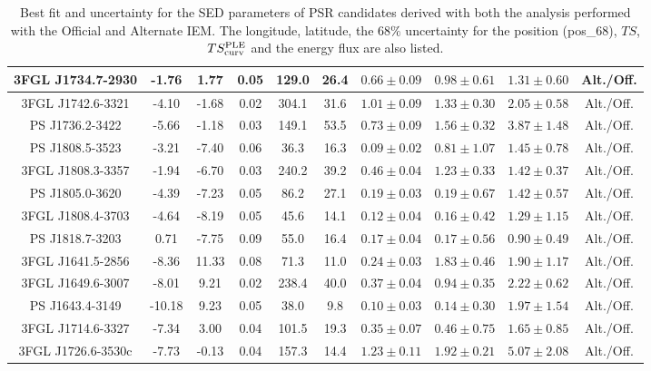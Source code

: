 \begin{table*}
\begin{tabular}{|c|c|c|c|c|c|c|c|c|c|}
\hline 
 3FGL J1734.7-2930 & -1.76 & 1.77 & 0.05 & 129.0 & 26.4 & $0.66\pm0.09$ & $0.98\pm0.61$ & $1.31\pm0.60$ & Alt./Off.\\
\hline 
 3FGL J1742.6-3321 & -4.10 & -1.68 & 0.02 & 304.1 & 31.6 & $1.01\pm0.09$ & $1.33\pm0.30$ & $2.05\pm0.58$ & Alt./Off.\\
\hline 
 PS J1736.2-3422 & -5.66 & -1.18 & 0.03 & 149.1 & 53.5 & $0.73\pm0.09$ & $1.56\pm0.32$ & $3.87\pm1.48$ & Alt./Off.\\
\hline 
 PS J1808.5-3523 & -3.21 & -7.40 & 0.06 & 36.3 & 16.3 & $0.09\pm0.02$ & $0.81\pm1.07$ & $1.45\pm0.78$ & Alt./Off.\\
\hline 
 3FGL J1808.3-3357 & -1.94 & -6.70 & 0.03 & 240.2 & 39.2 & $0.46\pm0.04$ & $1.23\pm0.33$ & $1.42\pm0.37$ & Alt./Off.\\
\hline 
 PS J1805.0-3620 & -4.39 & -7.23 & 0.05 & 86.2 & 27.1 & $0.19\pm0.03$ & $0.19\pm0.67$ & $1.42\pm0.57$ & Alt./Off.\\
\hline 
 3FGL J1808.4-3703 & -4.64 & -8.19 & 0.05 & 45.6 & 14.1 & $0.12\pm0.04$ & $0.16\pm0.42$ & $1.29\pm1.15$ & Alt./Off.\\
\hline 
 PS J1818.7-3203 & 0.71 & -7.75 & 0.09 & 55.0 & 16.4 & $0.17\pm0.04$ & $0.17\pm0.56$ & $0.90\pm0.49$ & Alt./Off.\\
\hline 
 3FGL J1641.5-2856 & -8.36 & 11.33 & 0.08 & 71.3 & 11.0 & $0.24\pm0.03$ & $1.83\pm0.46$ & $1.90\pm1.17$ & Alt./Off.\\
\hline 
 3FGL J1649.6-3007 & -8.01 & 9.21 & 0.02 & 238.4 & 40.0 & $0.37\pm0.04$ & $0.94\pm0.35$ & $2.22\pm0.62$ & Alt./Off.\\
\hline 
 PS J1643.4-3149 & -10.18 & 9.23 & 0.05 & 38.0 & 9.8 & $0.10\pm0.03$ & $0.14\pm0.30$ & $1.97\pm1.54$ & Alt./Off.\\
\hline 
 3FGL J1714.6-3327 & -7.34 & 3.00 & 0.04 & 101.5 & 19.3 & $0.35\pm0.07$ & $0.46\pm0.75$ & $1.65\pm0.85$ & Alt./Off.\\
\hline 
 3FGL J1726.6-3530c & -7.73 & -0.13 & 0.04 & 157.3 & 14.4 & $1.23\pm0.11$ & $1.92\pm0.21$ & $5.07\pm2.08$ & Alt./Off.\\
\hline 
\hline 
\end{tabular}
\caption{Best fit and uncertainty for the SED parameters of PSR 
  candidates derived with both the analysis performed with the 
  Official and Alternate IEM. The longitude, latitude, the $68\%$ 
  uncertainty for the position (pos\_68), $TS$, $TS^{\rm{PLE}}_{\rm{curv}}$ and the energy flux are also listed.}
\label{tab:psrcandrefoff}
\end{table*}

